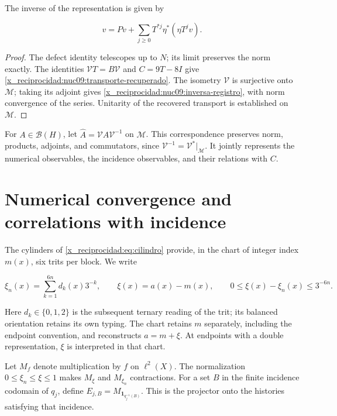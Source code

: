The inverse of the representation is given by



\begin{equation}
v=Pv+\sum_{j\ge0}T^{*j}\eta^*(\eta T^jv).
\label{x_reciprocidad:nuc09:inversa-registro}
\end{equation}



\begin{proof}
The defect identity telescopes up to \(N\); its limit preserves the norm exactly. The identities \(\mathcal VT=B\mathcal V\) and \(C=9T-8I\) give \eqref{x_reciprocidad:nuc09:transporte-recuperado}. The isometry \(\mathcal V\) is surjective onto \(\mathcal M\); taking its adjoint gives \eqref{x_reciprocidad:nuc09:inversa-registro}, with norm convergence of the series. Unitarity of the recovered transport is established on \(\mathcal M\).
\end{proof}

For \(A\in\mathcal B(H)\), let \(\widehat A=\mathcal VA\mathcal V^{-1}\) on \(\mathcal M\). This correspondence preserves norm, products, adjoints, and commutators, since \(\mathcal V^{-1}=\mathcal V^*|_{\mathcal M}\). It jointly represents the numerical observables, the incidence observables, and their relations with \(C\).

\section{Numerical convergence and correlations with incidence}

The cylinders of \eqref{x_reciprocidad:eq:cilindro} provide, in the chart of
integer index \(m(x)\), six trits per block. We write



\[
\xi_n(x)=\sum_{k=1}^{6n}d_k(x)3^{-k},\qquad
\xi(x)=a(x)-m(x),\qquad 0\le\xi(x)-\xi_n(x)\le3^{-6n}.
\]



Here \(d_k\in\{0,1,2\}\) is the subsequent ternary reading of the trit;
its balanced orientation retains its own typing. The chart
retains \(m\) separately, including the endpoint convention,
and reconstructs \(a=m+\xi\). At endpoints with a double representation,
\(\xi\) is interpreted in that chart.

Let \(M_f\) denote multiplication by \(f\) on \(\ell^2(X)\). The normalization \(0\le\xi_n\le\xi\le1\) makes \(M_\xi\) and \(M_{\xi_n}\) contractions. For a set \(B\) in the finite incidence codomain of \(q_j\), define \(E_{j,B}=M_{\mathbf1_{q_j^{-1}(B)}}\). This is the projector onto the histories satisfying that incidence.

